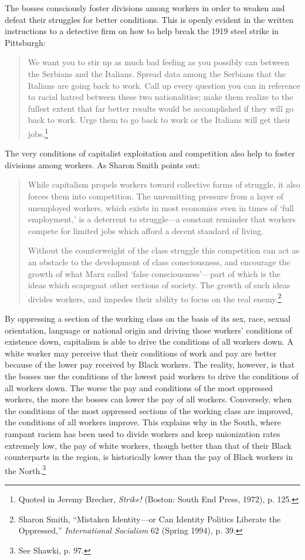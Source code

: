 The bosses consciously foster divisions among workers in order to weaken and defeat their struggles for better conditions. This is openly evident in the written instructions to a detective firm on how to help break the 1919 steel strike in Pittsburgh:

\blockquote{We want you to stir up as much bad feeling as you possibly can between the Serbians and the Italians. Spread data among the Serbians that the Italians are going back to work. Call up every question you can in reference to racial hatred between these two nationalities; make them realize to the fullest extent that far better results would be accomplished if they will go back to work. Urge them to go back to work or the Italians will get their jobs.\footnote{Quoted in Jeremy Brecher, \emph{Strike!} (Boston: South End Press, 1972), p. 125.}}

The very conditions of capitalist exploitation and competition also help to foster divisions among workers. As Sharon Smith points out:

\blockquote{While capitalism propels workers toward collective forms of struggle, it also forces them into competition. The unremitting pressure from a layer of unemployed workers, which exists in most economies even in times of `full employment,' is a deterrent to struggle---a constant reminder that workers compete for limited jobs which afford a decent standard of living.

Without the counterweight of the class struggle this competition can act as an obstacle to the development of class consciousness, and encourage the growth of what Marx called `false consciousness'---part of which is the ideas which scapegoat other sections of society. The growth of such ideas divides workers, and impedes their ability to focus on the real enemy.\footnote{Sharon Smith, ``Mistaken Identity---or Can Identity Politics Liberate the Oppressed,'' \emph{International Socialism} 62 (Spring 1994), p. 39.}}

By oppressing a section of the working class on the basis of its sex, race, sexual orientation, language or national origin and driving those workers' conditions of existence down, capitalism is able to drive the conditions of all workers down. A white worker may perceive that their conditions of work and pay are better because of the lower pay received by Black workers. The reality, however, is that the bosses use the conditions of the lowest paid workers to drive the conditions of all workers down. The worse the pay and conditions of the most oppressed workers, the more the bosses can lower the pay of all workers. Conversely, when the conditions of the most oppressed sections of the working class are improved, the conditions of all workers improve. This explains why in the South, where rampant racism has been used to divide workers and keep unionization rates extremely low, the pay of white workers, though better than that of their Black counterparts in the region, is historically lower than the pay of Black workers in the North.\footnote{See Shawki, p. 97.}

